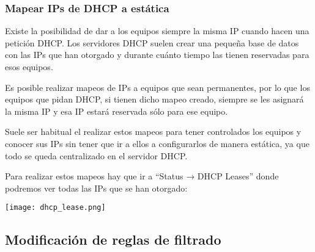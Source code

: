 \subsubsection{Mapear IPs de DHCP a estática}
Existe la posibilidad de dar a los equipos siempre la misma IP cuando hacen una petición DHCP. Los servidores DHCP suelen crear una pequeña base de datos con las IPs que han otorgado y durante cuánto tiempo las tienen reservadas para esos equipos.

Es posible realizar mapeos de IPs a equipos que sean permanentes, por lo que los equipos que pidan DHCP, si tienen dicho mapeo creado, siempre se les asignará la misma IP y esa IP estará reservada sólo para ese equipo.

Suele ser habitual el realizar estos mapeos para tener controlados los equipos y conocer sus IPs sin tener que ir a ellos a configurarlos de manera estática, ya que todo se queda centralizado en el servidor DHCP.

Para realizar estos mapeos hay que ir a “Status → DHCP Leases” donde podremos ver todas las IPs que se han otorgado:

\begin{center}
    \texttt{[image: dhcp\_lease.png]}
\end{center}

\subsection{Modificación de reglas de filtrado}